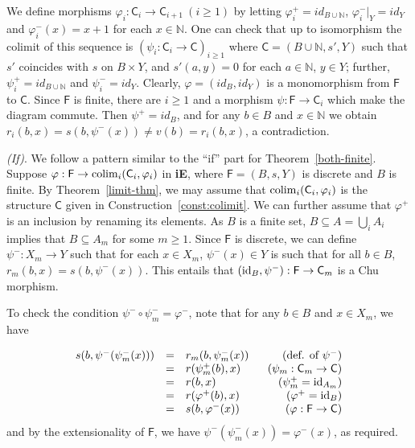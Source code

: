 \documentclass{LMCS}
\let\epf\endproof
\begin{document}
We define morphisms $\varphi_i: \mathsf{C}_i \to \mathsf{C}_{i+1} ~(i
\geq 1)$ by letting $\varphi_i^+ = id_{B \cup \mathbb{N}}$,
${\varphi_i^-}|_Y=id_Y$ and $\varphi_i^-(x) = x+1$ for each $x \in
\mathbb{N}$.  One can check that up to isomorphism the colimit of this
sequence is $(\psi_i: \mathsf{C}_i \to \mathsf{C})_{i \geq 1}$ where
$\mathsf{C}=(B \cup \mathbb{N}, s',Y)$ such that $s'$ coincides with
$s$ on $B \times Y$, and $s'(a,y) = 0$ for each $a \in \mathbb{N}$, $y
\in Y$; further, $\psi_i^+ = id_{B \cup \mathbb{N}}$ and $\psi_i^- =
id_Y$. Clearly, $\varphi=(id_B, id_Y)$ is a monomorphism from $\mathsf{F}$
to $\mathsf{C}$. Since $\mathsf{F}$ is finite, there are $i \geq 1$
and a morphism $\psi: \mathsf{F} \to \mathsf{C}_i$ which make the
diagram commute. Then $\psi^+=id_B$, and for any $b \in B$ and $x \in
\mathbb{N}$ we obtain $r_i(b,x)= s(b, \psi^-(x)) \ne v(b) = r_i(b,x)$,
a contradiction. 


{\em (If)}.  We follow a pattern  similar to the ``if'' part for
Theorem~\ref{both-finite}.  Suppose $\varphi: \mathsf{F} \to
{{\rm co}\!\lim_{i}}(\mathsf{C}_i, \varphi_i)$ in {\bf iE},
where $\mathsf{F} = (B, s, Y)$ is discrete and $B$ is finite. 
By Theorem~\ref{limit-thm},  we may
assume that ${{\rm co}\!\lim_{i}}(\mathsf{C}_i, \varphi_i)$
is the structure  $\mathsf{C}$ given in Construction~\ref{const:colimit}. 
  We can further assume that $\varphi^+$ is an
inclusion by renaming its elements.  As $B$ is a finite set, $B
\subseteq A=\bigcup_i A_i$ implies that $B\subseteq A_m$ for some
$m\geq 1$.  Since $\mathsf{F}$ is discrete, we can define $\psi^-: X_m
\rightarrow Y$ such that for each $x\in X_m$, $\psi^-(x) \in Y$ is
such that for all $b\in B$, $r_m(b, x) = s(b, \psi^-(x))$. 
This entails that $({\rm id}_B, \psi^-): \mathsf{F}\to \mathsf{C}_m$ is a
Chu morphism. 

To check the condition $\psi^- \circ \psi^-_m =  \varphi^-$, note
that for any $b\in B$ and $x \in X_m$, we have

\[\begin{array}{rclr}
s( b,  \psi^-(\psi_m^-(x) ) )  &=& r_m( b,  \psi_m^-(x) ) &~~\mbox{(def. of $\psi^-$)}\\
&=& r( \psi^+_m(b), x) &~~\mbox{($\psi_m: \mathsf{C}_m\to \mathsf{C}$)}\\
&=& r(b, x)  &~~\mbox{($\psi^+_m={\rm id}_{A_m}$)}\\
&=& r(\varphi^+(b), x)  &~~\mbox{($\varphi^+ = {\rm id}_{B}$)}\\
&=& s(b,  \varphi^-(x)) &~~\mbox{($\varphi: \mathsf{F}\to \mathsf{C}$)}\\
\end{array}\]
and by the extensionality of $\mathsf{F}$, we have $\psi^-(\psi_m^-(x) ) = \varphi^-(x)$, as required. 
\epf
\end{document}
